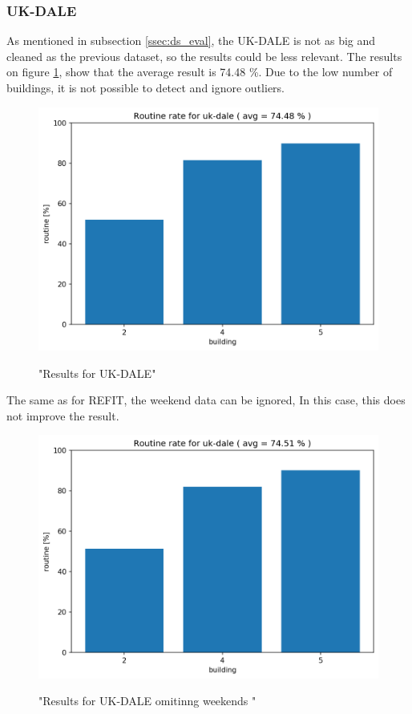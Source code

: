 \subsubsection{UK-DALE}

As mentioned in subsection \ref{ssec:ds_eval}, the UK-DALE is not as big and cleaned as the previous dataset, so the results could be less relevant.
The results on figure \ref{fig:ukdale_res}, show that the average result is 74.48 \%. 
Due to the low number of buildings, it is not possible to detect and ignore outliers.

\begin{figure}[H]
	\centering
	\caption{"Results for UK-DALE"}
	\includegraphics[width=.7\textwidth]{Figures/EC/ukdale_res.png}
	\label{fig:ukdale_res}
\end{figure}

The same as for REFIT, the weekend data can be ignored,
In this case, this does not improve the result. 

\begin{figure}[H]
	\centering
	\caption{"Results for UK-DALE omitinng weekends "}
	\includegraphics[width=.7\textwidth]{Figures/EC/ukdale_nw_res.png}
	\label{fig:ukdale_res_nw}
\end{figure}

